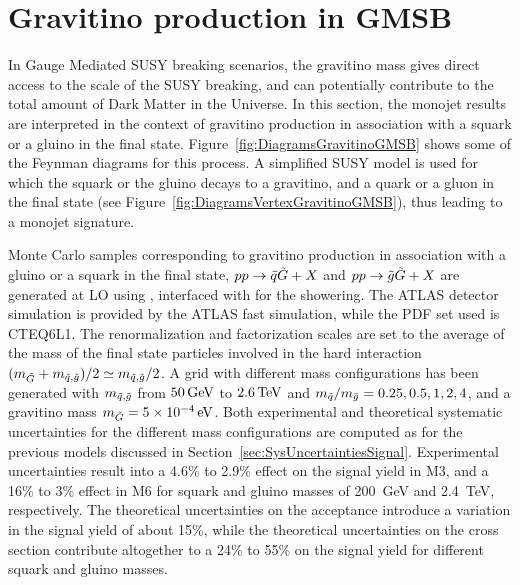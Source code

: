 


\section{Gravitino production in GMSB}
    \label{sec:GravitinoProduction}

In Gauge Mediated SUSY breaking scenarios, the gravitino mass gives direct access to the scale of the SUSY breaking, and can potentially contribute to the total amount of Dark Matter in the Universe.
In this section, the monojet results are interpreted in the context of gravitino production in association with a squark or a gluino in the final state.
Figure~\ref{fig:DiagramsGravitinoGMSB} shows some of the Feynman diagrams for this process.
A simplified SUSY model is used for which the squark or the gluino decays to a gravitino, and a quark or a gluon in the final state (see Figure~\ref{fig:DiagramsVertexGravitinoGMSB}), thus leading to a monojet signature.

Monte Carlo samples corresponding to gravitino production in association with a gluino or a squark in the final state, $pp\rightarrow\tilde{q}\tilde{G}+X$ and $pp\rightarrow\tilde{g}\tilde{G}+X$ are generated at LO using \madgraph{}, interfaced with \pythia{} for the showering.
The ATLAS detector simulation is provided by the ATLAS fast simulation, while the PDF set used is CTEQ6L1.
The renormalization and factorization scales are set to the average of the mass of the final state particles involved in the hard interaction $(m_{\tilde{G}} + m_{\tilde{q} , \tilde{g}})/2 \simeq m_{\tilde{q} , \tilde{g}}/2$.
A grid with different mass configurations has been generated with $m_{\tilde{q}, \tilde{g}}$ from $\unit[50]{GeV}$ to $\unit[2.6]{TeV}$ and $m_{\tilde{q}}/m_{\tilde{g}} = 0.25, 0.5, 1, 2, 4$, and a gravitino mass $m_{\gravino} = \unit[5 \times 10^{-4}]{eV}$.
Both experimental and theoretical systematic uncertainties for the different mass configurations are computed as for the previous models discussed in Section~\ref{sec:SysUncertaintiesSignal}.
Experimental uncertainties result into a 4.6\% to 2.9\% effect on the signal yield in M3, and a 16\% to 3\% effect in M6 for squark and gluino masses of 200~GeV and 2.4~TeV, respectively.
The theoretical uncertainties on the acceptance introduce a variation in the signal yield of about 15\%, while the theoretical uncertainties on the cross section contribute altogether to a 24\% to 55\% on the signal yield for different squark and gluino masses.


